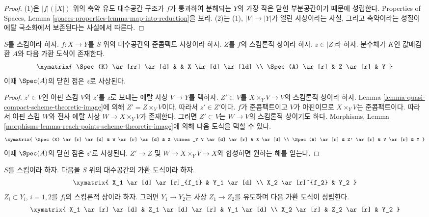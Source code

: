 \begin{proof}
(1)은 $\overline{|f|(|X|)}$ 위의 축약 유도 대수공간 구조가
$f$가 통과하여 분해되는 $Y$의 가장 작은 닫힌 부분공간이기 때문에
성립한다. Properties of Spaces, Lemma
\ref{spaces-properties-lemma-map-into-reduction}을 보라.
(2)는 (1), $|V| \to |Y|$가 열린 사상이라는 사실, 그리고
축약이라는 성질이 에탈 국소화에서 보존된다는 사실에서 따른다.
\end{proof}

\begin{lemma}
\label{lemma-reach-points-scheme-theoretic-image}
$S$를 스킴이라 하자.
$f : X \to Y$를 $S$ 위의 대수공간의 준콤팩트 사상이라 하자.
$Z$를 $f$의 스킴론적 상이라 하자.
$z \in |Z|$라 하자. 분수체가 $K$인 값매김환 $A$와
다음 가환 도식이 존재한다.
$$
\xymatrix{
\Spec(K) \ar[rr] \ar[d] & & X \ar[d] \ar[ld] \\
\Spec(A) \ar[r] & Z \ar[r] & Y
}
$$
이때 $\Spec(A)$의 닫힌 점은 $z$로 사상된다.
\end{lemma}

\begin{proof}
$z' \in V$인 아핀 스킴 $V$와 $z'$를 $z$로 보내는 에탈
사상 $V \to Y$를 택하자.
$Z' \subset V$를 $X \times_Y V \to V$의 스킴론적 상이라 하자.
Lemma \ref{lemma-quasi-compact-scheme-theoretic-image}에 의해
$Z' = Z \times_Y V$이다. 따라서 $z' \in Z'$이다.
$f$가 준콤팩트이고 $V$가 아핀이므로 $X \times_Y V$는
준콤팩트이다. 따라서 아핀 스킴 $W$와 전사 에탈 사상
$W \to X \times_Y V$가 존재한다. 그러면 $Z' \subset V$는
$W \to V$의 스킴론적 상이기도 하다.
Morphisms, Lemma
\ref{morphisms-lemma-reach-points-scheme-theoretic-image}에 의해
다음 도식을 택할 수 있다.
$$
\xymatrix{
\Spec(K) \ar[r] \ar[d] &
W \ar[r] \ar[d] &
X \times_Y V \ar[d] \ar[r] &
X \ar[d] \\
\Spec(A) \ar[r] &
Z' \ar[r] &
V \ar[r] &
Y
}
$$
이때 $\Spec(A)$의 닫힌 점은 $z'$로 사상된다.
$Z' \to Z$ 및 $W \to X \times_Y V \to X$와 합성하면
원하는 해를 얻는다.
\end{proof}

\begin{lemma}
\label{lemma-factor-factor}
$S$를 스킴이라 하자. 다음을 $S$ 위의 대수공간의 가환 도식이라 하자.
$$
\xymatrix{
X_1 \ar[d] \ar[r]_{f_1} & Y_1 \ar[d] \\
X_2 \ar[r]^{f_2} & Y_2
}
$$
$Z_i \subset Y_i$, $i = 1, 2$를 $f_i$의 스킴론적 상이라 하자.
그러면 $Y_1 \to Y_2$는 사상 $Z_1 \to Z_2$를 유도하며
다음 가환 도식이 성립한다.
$$
\xymatrix{
X_1 \ar[r] \ar[d] & Z_1 \ar[d] \ar[r] & Y_1 \ar[d] \\
X_2 \ar[r] & Z_2 \ar[r] & Y_2
}
$$
\end{lemma}


